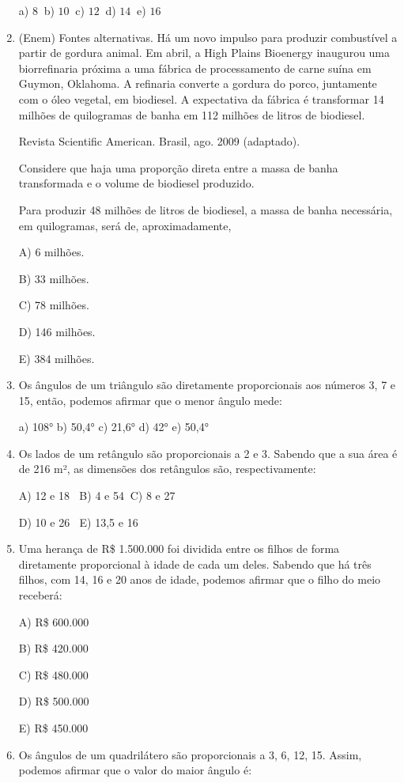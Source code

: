 \begin{multicols*}{2}
\begin{enumerate}
		a) $8 \ $ b) $10 \ $ c) $12 \ $ d) $14 \ $ e) $16 $

		\item (Enem) Fontes alternativas. Há um novo impulso para produzir combustível a partir de gordura animal. Em abril, a High Plains Bioenergy inaugurou uma biorrefinaria próxima a uma fábrica de processamento de carne suína em Guymon, Oklahoma. A refinaria converte a gordura do porco, juntamente com o óleo vegetal, em biodiesel. A expectativa da fábrica é transformar 14 milhões de quilogramas de banha em 112 milhões de litros de biodiesel.

Revista Scientific American. Brasil, ago. 2009 (adaptado).

Considere que haja uma proporção direta entre a massa de banha transformada e o volume de biodiesel produzido.

Para produzir 48 milhões de litros de biodiesel, a massa de banha necessária, em quilogramas, será de, aproximadamente,

A) 6 milhões.

B) 33 milhões.

C) 78 milhões.

D) 146 milhões.

E) 384 milhões.

		\item Os ângulos de um triângulo são diretamente proporcionais aos números 3, 7 e 15, então, podemos afirmar que o menor ângulo mede:
		
		a) 108°  b) 50,4°  c) 21,6°  d) 42°  e) 50,4°

		\item Os lados de um retângulo são proporcionais a 2 e 3. Sabendo que a sua área é de 216 m², as dimensões dos retângulos são, respectivamente:

A) 12 e 18 $ \ $ B) 4 e 54$ \ $ C) 8 e 27

D) 10 e 26 $ \ $ E) 13,5 e 16

		\item Uma herança de R\$ 1.500.000 foi dividida entre os filhos de forma diretamente proporcional à idade de cada um deles. Sabendo que há três filhos, com 14, 16 e 20 anos de idade, podemos afirmar que o filho do meio receberá:

A) R\$ 600.000

B) R\$ 420.000

C) R\$ 480.000

D) R\$ 500.000

E) R\$ 450.000

		\item Os ângulos de um quadrilátero são proporcionais a 3, 6, 12, 15. Assim, podemos afirmar que o valor do maior ângulo é:
		

\end{enumerate}
\end{multicols*}
